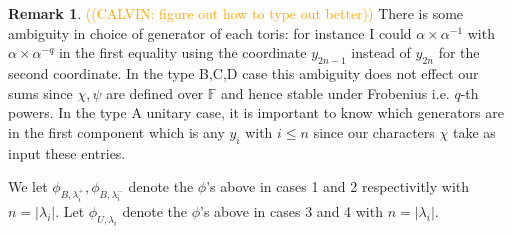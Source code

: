 \documentclass[12pt, reqno]{amsart}
\theoremstyle{definition}
\theoremstyle{definition}
\newtheorem{remark}[theorem]{Remark}
\theoremstyle{definition}
\newcommand{\finiteField}{\mathbb{F}}
\newcommand{\calvin}[1]{\textcolor{orange}{\sffamily ((CALVIN: #1))}}
\begin{document}
\begin{remark}\calvin{figure out how to type out better}
There is some ambiguity in choice of generator of each toris: for instance I could $\alpha \times \alpha^{-1}$ with $\alpha \times \alpha^{-q}$ in the first equality using the coordinate $y_{2n-1}$ instead of $y_{2n}$ for the second coordinate. In the type B,C,D case this ambiguity does not effect our sums since $\chi,\psi$ are defined over $\finiteField$ and hence stable under Frobenius i.e. $q$-th powers. In the type A unitary case, it is important to know which generators are in the first component which is any $y_i$ with $i\leq n$ since our characters $\chi$ take as input these entries.
\end{remark}

We let $\phi_{B,\lambda_i^+}, \phi_{B,\lambda_i^-}$ denote the $\phi$'s above in cases 1 and 2 respectivitly with $n = |\lambda_i|$. 
Let $\phi_{U,\lambda_i}$ denote the $\phi$'s above in cases 3 and 4 with $n = |\lambda_i|$.
\end{document}
